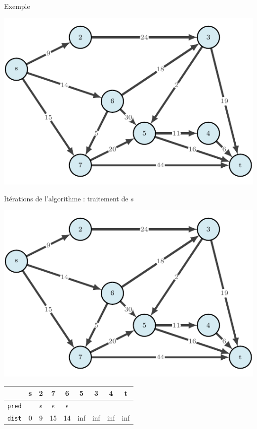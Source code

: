 \begin{frame}{Exemple}
    \begin{center}
        \includegraphics[height=.6\textheight]{fig/dijkstra-0.pdf}

    \end{center}
\end{frame}

\begin{frame}{Itérations de l'algorithme : traitement de $s$}
    \begin{center}
        \includegraphics[height=.6\textheight]{fig/dijkstra-0.pdf}      
    \begin{tabular}{c|cccccccc}
      
        & \textbf{s}   &2      &7      &6      &5      &3      &4      &t      \\
        \hline
        \texttt{pred} & &s      &s      &s      &       &       &       &       \\
        \texttt{dist} & 0       &9      &15     &14     &inf    &inf    &inf    &inf    \\
            \end{tabular}
\end{center}
\end{frame}


